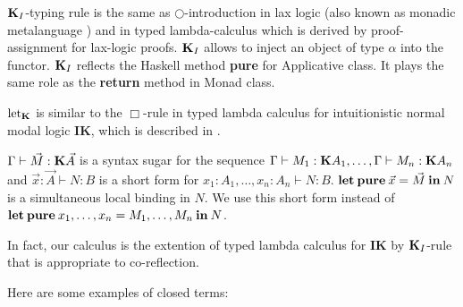 \documentclass[a4paper]{article}
\begin{document}
  ${\bf K}_I$-typing rule is the same as $\bigcirc$-introduction in lax logic (also known as monadic
  metalanguage \cite{Lax}) and in typed lambda-calculus which is derived by proof-assignment for lax-logic
  proofs.
  ${\bf K}_I$ allows to inject an object of type $\alpha$ into the functor. ${\bf K}_I$  reflects the
  Haskell method {\bf pure} for Applicative class. It plays the same role as the {\bf return} method in Monad class.

  $\text{let}_{{\bf K}}$ is similar to the $\Box$-rule in typed lambda calculus for intuitionistic normal modal logic {\bf IK}, which is described in \cite{ModalK}.

$\Gamma \vdash \vec{M} : {\bf K} \vec{A}$ is a syntax sugar for the sequence $\Gamma \vdash M_1 : {\bf K}A_1,\dots,\Gamma \vdash M_n : {\bf K}A_n$ and $\vec{x} : \vec{A} \vdash N : B$ is a short form for $x_1 : A_1, \dots, x_n : A_n \vdash N : B$.
${\bf let \: pure \:} \vec{x} = \vec{M} {\: \bf in \: } N$ is a simultaneous local binding in $N$.
We use this short form instead of ${\bf let \: pure\:} x_1,\dots,x_n = M_1,\dots,M_n {\: \bf in \:} N$.

In fact, our calculus is the extention of typed lambda calculus for {\bf IK} by ${\bf K}_I$-rule that is appropriate to co-reflection.

  \vspace{\baselineskip}

Here are some examples of closed terms:

\begin{prooftree}
\end{prooftree}

\begin{prooftree}
\end{prooftree}
\end{document}
